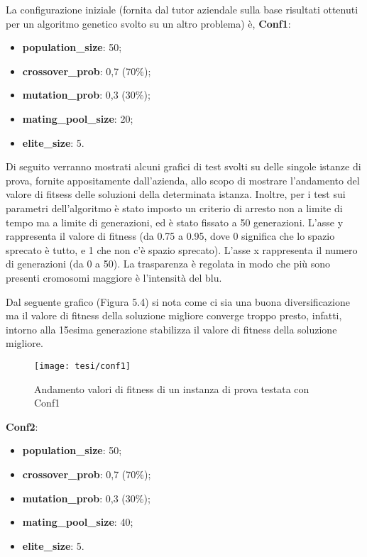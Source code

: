 \noindent La configurazione iniziale (fornita dal tutor aziendale sulla base risultati ottenuti per un algoritmo genetico svolto su un altro problema) è, \textbf{Conf1}:
\begin{itemize}
	\item\textbf{population\_size}: 50;
	\item\textbf{crossover\_prob}: 0,7 (70\%);
	\item\textbf{mutation\_prob}: 0,3 (30\%);
	\item\textbf{mating\_pool\_size}: 20;
	\item\textbf{elite\_size}: 5.
\end{itemize}

Di seguito verranno mostrati alcuni grafici di test svolti su delle singole istanze di prova, fornite appositamente dall'azienda, allo scopo di mostrare l'andamento del valore di fitsess delle soluzioni della determinata istanza. Inoltre, per i test sui parametri dell'algoritmo è stato imposto un criterio di arresto non a limite di tempo ma a limite di generazioni, ed è stato fissato a 50 generazioni. 
L'asse y rappresenta il valore di fitness (da 0.75 a 0.95, dove 0 significa che lo spazio sprecato è tutto, e 1 che non c'è spazio sprecato). L'asse x rappresenta il numero di generazioni (da 0 a 50).
La trasparenza è regolata in modo che più sono presenti cromosomi maggiore è l'intensità del blu.

Dal seguente grafico (Figura 5.4) si nota come ci sia una buona diversificazione ma il valore di fitness della soluzione migliore converge troppo presto, infatti, intorno alla 15esima generazione stabilizza il valore di fitness della soluzione migliore. 

\begin{figure}[!ht] 
    \centering 
    \texttt{[image: tesi/conf1]} 
    \caption{Andamento valori di fitness di un instanza di prova testata con Conf1}
\end{figure}

\textbf{Conf2}:
\begin{itemize}
	\item\textbf{population\_size}: 50;
	\item\textbf{crossover\_prob}: 0,7 (70\%);
	\item\textbf{mutation\_prob}: 0,3 (30\%);
	\item\textbf{mating\_pool\_size}: 40;
	\item\textbf{elite\_size}: 5.
\end{itemize}

